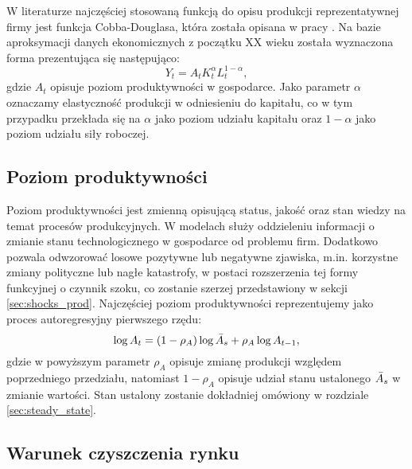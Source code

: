 
W literaturze najczęściej stosowaną funkcją do opisu produkcji reprezentatywnej firmy jest funkcja Cobba-Douglasa, która została opisana w pracy \cite{10.2307/1811556}. Na bazie aproksymacji danych ekonomicznych z początku XX wieku została wyznaczona forma prezentująca się następująco:
\begin{equation}
    \label{eqn:production_firm_base}
    Y_{t} = A_t K_{t}^\alpha L^{1-\alpha}_{t},
\end{equation}
gdzie $A_t$ opisuje poziom produktywności w gospodarce. Jako parametr $\alpha$ oznaczamy elastyczność produkcji w odniesieniu do kapitału, co w tym przypadku przekłada się na $\alpha$ jako poziom udziału kapitału oraz $1-\alpha$ jako poziom udziału siły roboczej.

\subsection{Poziom produktywności}

Poziom produktywności jest zmienną opisującą status, jakość oraz stan wiedzy na temat procesów produkcyjnych. W modelach służy oddzieleniu informacji o zmianie stanu technologicznego w gospodarce od problemu firm. Dodatkowo pozwala odwzorować losowe pozytywne lub negatywne zjawiska, m.in. korzystne zmiany polityczne lub nagłe katastrofy, w postaci rozszerzenia tej formy funkcyjnej o czynnik szoku, co zostanie szerzej przedstawiony w sekcji \ref{sec:shocks_prod}. Najczęściej poziom produktywności reprezentujemy jako proces autoregresyjny pierwszego rzędu:
\begin{equation*}
    \log{A_t} = (1-\rho_A)\log{\bar{A}_s} + \rho_A \log{A_{t-1}},
\end{equation*}
gdzie w powyższym parametr $\rho_A$ opisuje zmianę produkcji względem poprzedniego przedziału, natomiast $1-\rho_A$ opisuje udział stanu ustalonego $\bar{A}_s$ w zmianie wartości. Stan ustalony zostanie dokładniej omówiony w rozdziale \ref{sec:steady_state}.

\subsection{Warunek czyszczenia rynku}

